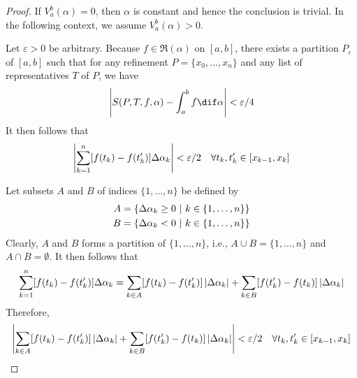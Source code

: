 \documentclass[thmcnt=section, color=blue, 12pt]{my-elegantbook}
\begin{document}
\begin{proof}
	If $V_a^b(\alpha) = 0$, then $\alpha$ is constant
	and hence the conclusion is trivial.
	In the following context, we assume $V_a^b(\alpha) > 0$.

	Let $\varepsilon > 0$ be arbitrary.
	Because $f \in \mathfrak{R}(\alpha)$ on $[a, b]$,
	there exists a partition $P_\varepsilon$ of $[a, b]$
	such that
	for any refinement $P=\{x_0, \ldots, x_n\}$
	and any list of representatives $T$ of $P$, we have
	\begin{align*}
		\abs{S(P, T, f, \alpha) - \int_a^b f \dif \alpha} < \varepsilon / 4
	\end{align*}
	It then follows that
	\begin{align*}
		\left\lvert \sum_{k=1}^n [ f(t_k) - f(t^\prime_k) ] \Delta \alpha_k \right\rvert < \varepsilon / 2
		\quad \forall t_k, t^\prime_k \in [x_{k-1}, x_k]
	\end{align*}

	Let subsets $A$ and $B$ of indices $\{1, \ldots, n\}$ be defined by
	\begin{align*}
		A & = \left\{ \Delta \alpha_k \geq 0 \ \middle| \ k \in \{1, \ldots, n\} \right\} \\
		B & = \left\{ \Delta \alpha_k < 0 \ \middle| \ k \in \{1, \ldots, n\} \right\}
	\end{align*}
	Clearly, $A$ and $B$ forms a partition of $\{1, \ldots, n\}$,
	i.e., $A \cup B = \{1, \ldots, n\}$ and $A \cap B = \emptyset$.
	It then follows that
	\begin{align*}
		\sum_{k=1}^n [ f(t_k) - f(t^\prime_k) ] \Delta \alpha_k
		= \sum_{k \in A} [ f(t_k) - f(t^\prime_k) ] \left\lvert \Delta \alpha_k \right\rvert
		+ \sum_{k \in B} [ f(t_k^\prime) - f(t_k) ] \left\lvert \Delta \alpha_k \right\rvert
	\end{align*}
	Therefore,
	\begin{align}
		\left\lvert 
			\sum_{k \in A} [ f(t_k) - f(t^\prime_k) ] \left\lvert \Delta \alpha_k \right\rvert
			+ \sum_{k \in B} [ f(t_k^\prime) - f(t_k) ] \left\lvert \Delta \alpha_k \right\rvert
		 \right\rvert < \varepsilon / 2
		\quad \forall t_k, t^\prime_k \in [x_{k-1}, x_k]
		\label{eq:49}
	\end{align}



\end{proof}
\end{document}
